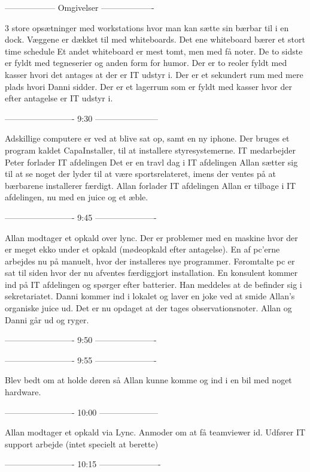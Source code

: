 \begin{linenumbers*}
------------------ Omgivelser -------------------

3 store opsætninger med workstations hvor man kan sætte sin bærbar til i en dock.
Væggene er dækket til med whiteboards.
Det ene whiteboard bærer et stort time schedule
Et andet whiteboard er mest tomt, men med få noter.
De to sidste er fyldt med tegneserier og anden form for humor.
Der er to reoler fyldt med kasser hvori det antages at der er IT udstyr i.
Der er et sekundert rum med mere plads hvori Danni sidder.
Der er et lagerrum som er fyldt med kasser hvor der efter antagelse er IT udstyr i.

------------------------- 9:30 -----------------------

Adskillige computere er ved at blive sat op, samt en ny iphone.
Der bruges et program kaldet CapaInstaller, til at installere styresystemerne.
IT medarbejder Peter forlader IT afdelingen
Det er en travl dag i IT afdelingen
Allan sætter sig til at se noget der lyder til at være sportsrelateret, imens der ventes på at bærbarene installerer færdigt.
Allan forlader IT afdelingen
Allan er tilbage i IT afdelingen, nu med en juice og et æble.

------------------------- 9:45 ----------------------

Allan modtager et opkald over lync.
Der er problemer med en maskine hvor der er meget ekko under et opkald (mødeopkald efter antagelse).
En af pc’erne arbejdes nu på manuelt, hvor der installeres nye programmer.
Føromtalte pc er sat til siden hvor der nu afventes færdiggjort installation.
En konsulent kommer ind på IT afdelingen og spørger efter batterier.
Han meddeles at de befinder sig i sekretariatet.
Danni kommer ind i lokalet og laver en joke ved at smide Allan’s organiske juice ud.
Det er nu opdaget at der tages observationsnoter.
Allan og Danni går ud og ryger.

------------------------- 9:50 ----------------------

------------------------- 9:55 ----------------------

Blev bedt om at holde døren så Allan kunne komme og ind i en bil med noget hardware.

------------------------- 10:00 ---------------------

Allan modtager et opkald via Lync.
Anmoder om at få teamviewer id.
Udfører IT support arbejde (intet specielt at berette)

------------------------- 10:15 ----------------------


\end{linenumbers*}
